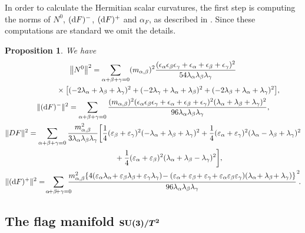 \documentclass[pdftex]{sigma}%
\numberwithin{equation}{section}
\newtheorem{Proposition}[Theorem]{Proposition}
 { \theoremstyle{definition}
\newtheorem{Definition}[Theorem]{Definition}
\newtheorem{Question}[Theorem]{Question}
\newtheorem*{Notation}{Notation}
\newtheorem{Example}[Theorem]{Example}
\newtheorem{Remark}[Theorem]{Remark} }
\begin{document}
In order to calculate the Hermitian scalar curvatures, the first step is computing the norms of $N^{0}$, $({\rm d}F)^{-}$, $({\rm d}F)^{+}$ and $\alpha_{F}$, as described in \cite{fu}. Since these computations are standard we omit the details.

\begin{Proposition} \label{prop-norma}
We have
\begin{gather*}
\big\|N^{0}\big\|^{2}=\sum_{\alpha+\beta+\gamma=0}(m_{\alpha,\beta})^{2} \dfrac{(\epsilon_{\alpha}\epsilon_{\beta}\epsilon_{\gamma}+\epsilon_{\alpha} +\epsilon_{\beta}+\epsilon_{\gamma})^2}{54\lambda_{\alpha}\lambda_{\beta}\lambda_{\gamma}}
\\ \hphantom{\big\|N^{0}\big\|^{2}=}
{}\times\big[(-2\lambda_{\alpha}+\lambda_{\beta}+\lambda_{\gamma})^{2}+ (-2\lambda_{\gamma}+\lambda_{\alpha}+\lambda_{\beta})^{2}+(-2\lambda_{\beta} +\lambda_{\alpha}+\lambda_{\gamma})^{2}\big],
\\
\|({\rm d}F)^{-}\|^{2}=\sum_{\alpha+\beta+\gamma=0}\dfrac{(m_{\alpha,\beta})^{2} (\epsilon_{\alpha}\epsilon_{\beta}\epsilon_{\gamma}+\epsilon_{\alpha}+\epsilon_{\beta}+\epsilon_{\gamma} )^2(\lambda_{\alpha}+\lambda_{\beta}+\lambda_{\gamma})^{2}} {96\lambda_{\alpha}\lambda_{\beta}\lambda_{\gamma}},
\\
\|DF\|^{2}=\sum_{\alpha+\beta+\gamma=0}\dfrac{m_{\alpha,\beta}^{2}}{3\lambda_{\alpha}\lambda_{\beta} \lambda_{\gamma}}\bigg[\dfrac{1}{4}(\varepsilon_{\beta}+\varepsilon_{\gamma})^{2} (-\lambda_{\alpha}+\lambda_{\beta}+\lambda_{\gamma})^{2}
+ \dfrac{1}{4}(\varepsilon_{\alpha}+\varepsilon_{\gamma})^{2}(\lambda_{\alpha}-\lambda_{\beta} +\lambda_{\gamma})^{2}
\\ \hphantom{\|DF\|^{2}=}
{}+\dfrac{1}{4}(\varepsilon_{\alpha}+\varepsilon_{\beta})^{2}(\lambda_{\alpha} +\lambda_{\beta}-\lambda_{\gamma})^{2}\bigg],
\\
\|({\rm d}F)^{+}\|^{2}=\!\sum_{\alpha\!+\beta\!+\gamma=0}\!\!\!\!\dfrac{m_{\alpha,\beta}^{2} \{4(\varepsilon_{\alpha}\lambda_{\alpha}\!+\varepsilon_{\beta}\lambda_{\beta} \!+\varepsilon_{\gamma}\lambda_{\gamma})\!-(\varepsilon_{\alpha}\!+\varepsilon_{\beta} \!+\varepsilon_{\gamma}\!+\varepsilon_{\alpha}\varepsilon_{\beta}\varepsilon_{\gamma}) (\lambda_{\alpha}\!+\lambda_{\beta}\!+\lambda_{\gamma})\}} {96\lambda_{\alpha}\lambda_{\beta}\lambda_{\gamma}}^{2}\!.
\end{gather*}
\end{Proposition}

\subsection[The flag manifold SU(3)/T\textasciicircum{}2]
{The flag manifold $\boldsymbol{{\rm SU}(3)/T^{2}}$}
\end{document}
